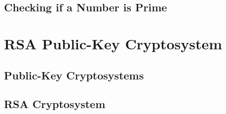 \documentclass{beamer}
\begin{document}
\subsection{Checking if a Number is Prime}

\section{RSA Public-Key Cryptosystem}


\subsection{Public-Key Cryptosystems}

\subsection{RSA Cryptosystem}
\end{document}
